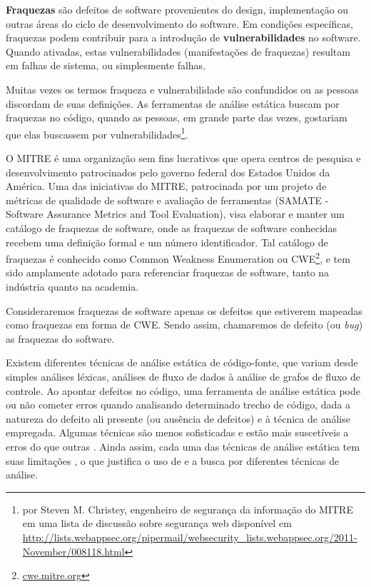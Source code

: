 \textbf{Fraquezas} são defeitos de software provenientes do design, implementação ou outras áreas do ciclo de desenvolvimento do software. Em condições específicas, fraquezas podem contribuir para a introdução de \textbf{vulnerabilidades} no software. Quando ativadas, estas vulnerabilidades (manifestações de fraquezas) resultam em falhas de sistema, ou simplesmente falhas.
\begin{citacao}
Muitas vezes os termos fraqueza e vulnerabilidade são confundidos ou as pessoas discordam de suas definições. As ferramentas de análise estática buscam por fraquezas no código, quando as pessoas, em grande parte das vezes, gostariam que elas buscassem por vulnerabilidades\footnote{por Steven M. Christey, engenheiro de segurança da informação do MITRE em uma lista de discussão sobre segurança web disponível em \url{http://lists.webappsec.org/pipermail/websecurity_lists.webappsec.org/2011-November/008118.html}}.
\end{citacao}

O MITRE é uma organização sem fins lucrativos que opera centros de pesquisa e desenvolvimento patrocinados pelo governo federal dos Estados Unidos da América. Uma das iniciativas do MITRE, patrocinada por um projeto de métricas de qualidade de software e avaliação de ferramentas (SAMATE - Software Assurance Metrics and Tool Evaluation), visa elaborar e manter um catálogo de fraquezas de software, onde as fraquezas de software conhecidas recebem uma definição formal e um número identificador. Tal catálogo de fraquezas é conhecido como Common Weakness Enumeration ou CWE\footnote{\url{cwe.mitre.org}}, e tem sido amplamente adotado para referenciar fraquezas de software, tanto na indústria quanto na academia.

Consideraremos fraquezas de software apenas os defeitos que estiverem mapeadas como fraquezas em forma de CWE. Sendo assim, chamaremos de defeito (ou \textit{bug}) as fraquezas do software.

Existem diferentes técnicas de análise estática de código-fonte, que variam desde simples análises léxicas, análises de fluxo de dados à análise de grafos de fluxo de controle. Ao apontar defeitos no código, uma ferramenta de análise estática pode ou não cometer erros quando analisando determinado trecho de código, dada a natureza do defeito ali presente (ou ausência de defeitos) e à técnica de análise empregada. Algumas técnicas são menos sofisticadas e estão mais suscetíveis a erros do que outras \cite{harvard}. Ainda assim, cada uma das técnicas de análise estática tem suas limitações \cite{pascal}, o que justifica o uso de e a busca por diferentes técnicas de análise.

